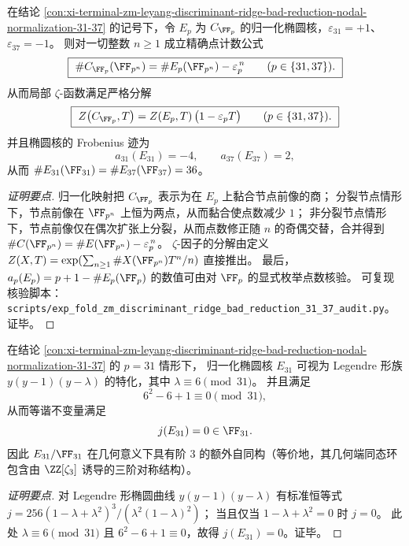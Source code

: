 \begin{conclusion}\label{con:xi-terminal-zm-leyang-discriminant-ridge-bad-reduction-zeta-factor-31-37}
在结论 \ref{con:xi-terminal-zm-leyang-discriminant-ridge-bad-reduction-nodal-normalization-31-37} 的记号下，令 \(E_p\) 为 \(C_{\FF_p}\) 的归一化椭圆核，\(\varepsilon_{31}=+1\)、\(\varepsilon_{37}=-1\)。
则对一切整数 \(n\ge 1\) 成立精确点计数公式
\[
\boxed{\ \#C_{\FF_p}(\FF_{p^{n}})=\#E_p(\FF_{p^{n}})-\varepsilon_p^{\,n}\qquad(p\in\{31,37\}).\ }
\]
从而局部 \(\zeta\)-函数满足严格分解
\[
\boxed{\ Z\!\left(C_{\FF_p},T\right)=Z\!\left(E_p,T\right)\bigl(1-\varepsilon_p T\bigr)\qquad(p\in\{31,37\}).\ }
\]
并且椭圆核的 Frobenius 迹为
\[
a_{31}(E_{31})=-4,\qquad a_{37}(E_{37})=2,
\]
从而
\(
\#E_{31}(\FF_{31})=\#E_{37}(\FF_{37})=36
\)。
\end{conclusion}
\begin{proof}[证明要点]
归一化映射把 \(C_{\FF_p}\) 表示为在 \(E_p\) 上黏合节点前像的商；
分裂节点情形下，节点前像在 \(\FF_{p^n}\) 上恒为两点，从而黏合使点数减少 \(1\)；
非分裂节点情形下，节点前像仅在偶次扩张上分裂，从而点数修正随 \(n\) 的奇偶交替，合并得到 \(\#C(\FF_{p^n})=\#E(\FF_{p^n})-\varepsilon_p^{\,n}\)。
\(\zeta\)-因子的分解由定义
\(
Z(X,T)=\exp(\sum_{n\ge 1}\#X(\FF_{p^n})T^n/n)
\)
直接推出。
最后，\(a_p(E_p)=p+1-\#E_p(\FF_p)\) 的数值可由对 \(\FF_p\) 的显式枚举点数核验。
可复现核验脚本：\texttt{scripts/exp\_fold\_zm\_discriminant\_ridge\_bad\_reduction\_31\_37\_audit.py}。证毕。
\end{proof}

\begin{conclusion}[\texorpdfstring{$p=31$}{p=31} 处归一化椭圆核的等谐型：\texorpdfstring{$j=0$}{j=0} 的刚性显影]\label{con:xi-terminal-zm-leyang-discriminant-ridge-bad-reduction-e31-j0}
在结论 \ref{con:xi-terminal-zm-leyang-discriminant-ridge-bad-reduction-nodal-normalization-31-37} 的 \(p=31\) 情形下，
归一化椭圆核 \(E_{31}\) 可视为 Legendre 形族 \(y(y-1)(y-\lambda)\) 的特化，其中 \(\lambda\equiv 6\pmod{31}\)。
并且满足
\[
6^{2}-6+1\equiv 0\pmod{31},
\]
从而等谐不变量满足
\[
j(E_{31})=0\in\FF_{31}.
\]
因此 \(E_{31}/\FF_{31}\) 在几何意义下具有阶 \(3\) 的额外自同构（等价地，其几何端同态环包含由 \(\ZZ[\zeta_3]\) 诱导的三阶对称结构）。
\end{conclusion}
\begin{proof}[证明要点]
对 Legendre 形椭圆曲线 \(y(y-1)(y-\lambda)\) 有标准恒等式
\(
j=256(1-\lambda+\lambda^{2})^{3}/(\lambda^{2}(1-\lambda)^{2})
\)；
当且仅当 \(1-\lambda+\lambda^{2}=0\) 时 \(j=0\)。
此处 \(\lambda\equiv 6\pmod{31}\) 且 \(6^{2}-6+1\equiv 0\)，故得 \(j(E_{31})=0\)。证毕。
\end{proof}

